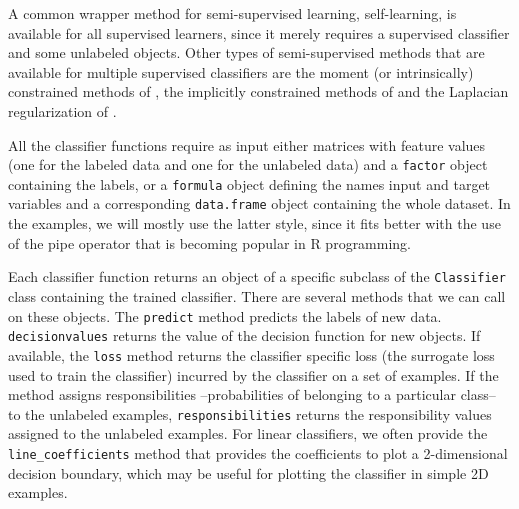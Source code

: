\documentclass[runningheads,a4paper]{llncs}\usepackage[]{graphicx}\usepackage[]{color}
\begin{document}
A common wrapper method for semi-supervised learning, self-learning, is available for all supervised learners, since it merely requires a supervised classifier and some unlabeled objects. Other types of semi-supervised methods that are available for multiple supervised classifiers are the moment (or intrinsically) constrained methods of \cite{Loog2010,Loog2014a}, the implicitly constrained methods of \cite{Krijthe2014,Krijthe2016,Krijthe2016d} and the Laplacian regularization of \cite{Belkin2006}.

All the classifier functions require as input either matrices with feature values (one for the labeled data and one for the unlabeled data) and a \texttt{factor} object containing the labels, or a \texttt{formula} object defining the names input and target variables and a corresponding \texttt{data.frame} object containing the whole dataset. In the examples, we will mostly use the latter style, since it fits better with the use of the pipe operator that is becoming popular in R programming.

Each classifier function returns an object of a specific subclass of the \texttt{Classifier} class containing the trained classifier. There are several methods that we can call on these objects. The \texttt{predict} method predicts the labels of new data. \texttt{decisionvalues} returns the value of the decision function for new objects. If available, the \texttt{loss} method returns the classifier specific loss (the surrogate loss used to train the classifier) incurred by the classifier on a set of examples. If the method assigns responsibilities --probabilities of belonging to a particular class-- to the unlabeled examples, \texttt{responsibilities} returns the responsibility values assigned to the unlabeled examples. For linear classifiers, we often provide the \texttt{line\_coefficients} method that provides the coefficients to plot a 2-dimensional decision boundary, which may be useful for plotting the classifier in simple 2D examples.
\end{document}
